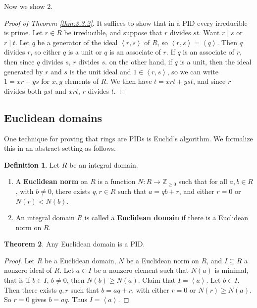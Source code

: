 \documentclass{article}
\newcommand{\Z}{\mathbb{Z}}
\newcommand{\rb}[1]{\left( #1 \right)}
\newcommand{\ab}[1]{\left\langle #1 \right\rangle}
\theoremstyle{definition}\newtheorem{definition}{Definition}[subsection]
\theoremstyle{definition}\newtheorem{remark}[definition]{Remark}
\theoremstyle{definition}\newtheorem*{example}{Example}
\theoremstyle{definition}\newtheorem*{note}{Note}
\newtheorem{theorem}[definition]{Theorem}
\begin{document}
Now we show $ 2 $.

\begin{proof}[Proof of Theorem \ref{thm:3.3.2}]
It suffices to show that in a PID every irreducible is prime. Let $ r \in R $ be irreducible, and suppose that $ r $ divides $ st $. Want $ r \mid s $ or $ r \mid t $. Let $ q $ be a generator of the ideal $ \ab{r, s} $ of $ R $, so $ \ab{r, s} = \ab{q} $. Then $ q $ divides $ r $, so either $ q $ is a unit or $ q $ is an associate of $ r $. If $ q $ is an associate of $ r $, then since $ q $ divides $ s $, $ r $ divides $ s $. on the other hand, if $ q $ is a unit, then the ideal generated by $ r $ and $ s $ is the unit ideal and $ 1 \in \ab{r, s} $, so we can write $ 1 = xr + ys $ for $ x, y $ elements of $ R $. We then have $ t = xrt + yst $, and since $ r $ divides both $ yst $ and $ xrt $, $ r $ divides $ t $.
\end{proof}


\subsection{Euclidean domains}

One technique for proving that rings are PIDs is Euclid's algorithm. We formalize this in an abstract setting as follows.

\begin{definition}
Let $ R $ be an integral domain.
\begin{enumerate}
\item A \textbf{Euclidean norm} on $ R $ is a function $ N : R \to \Z_{\ge 0} $ such that for all $ a, b \in R $, with $ b \ne 0 $, there exists $ q, r \in R $ such that $ a = qb + r $, and either $ r = 0 $ or $ N\rb{r} < N\rb{b} $.
\item An integral domain $ R $ is called a \textbf{Euclidean domain} if there is a Euclidean norm on $ R $.
\end{enumerate}
\end{definition}

\begin{theorem}
Any Euclidean domain is a PID.
\end{theorem}

\begin{proof}
Let $ R $ be a Euclidean domain, $ N $ be a Euclidean norm on $ R $, and $ I \subseteq R $ a nonzero ideal of $ R $. Let $ a \in I $ be a nonzero element such that $ N\rb{a} $ is minimal, that is if $ b \in I $, $ b \ne 0 $, then $ N\rb{b} \ge N\rb{a} $. Claim that $ I = \ab{a} $. Let $ b \in I $. Then there exists $ q, r $ such that $ b = aq + r $, with either $ r = 0 $ or $ N\rb{r} \ge N\rb{a} $. So $ r = 0 $ gives $ b = aq $. Thus $ I = \ab{a} $.
\end{proof}
\end{document}
